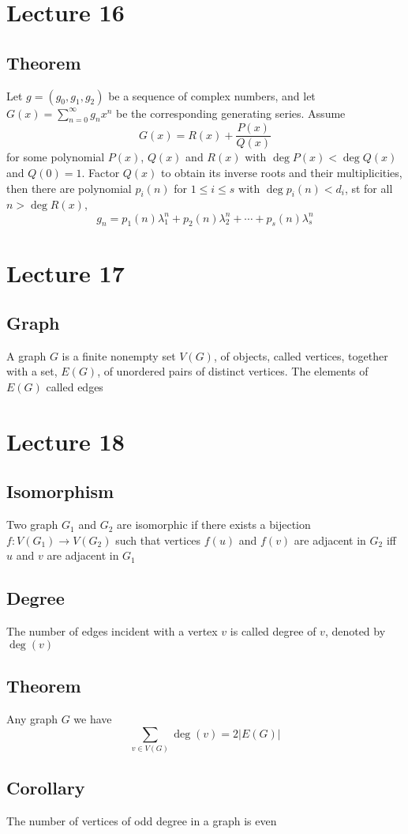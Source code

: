 \documentclass[11pt]{article}
\begin{document}
\section{Lecture 16}
\subsection{Theorem}
Let $g=(g_0,g_1,g_2)$ be a sequence of complex numbers, and let $G(x) = \sum_{n=0}^{\infty}g_nx^n$ be the corresponding generating series. Assume \[G(x) = R(x)+\dfrac{P(x)}{Q(x)}\]
for some polynomial $P(x)$, $Q(x)$ and $R(x)$ with $\deg P(x)<\deg Q(x)$ and $Q(0)=1$.
Factor $Q(x)$ to obtain its inverse roots and their multiplicities, then there are polynomial $p_i(n)$ for $1\leq i\leq s$ with $\deg p_i(n)<d_i$, st for all $n>\deg R(x)$,
\[g_n = p_1(n)\lambda_1^n+p_2(n)\lambda_2^n+\cdots+p_s(n)\lambda_s^n\]

\section{Lecture 17}
\subsection{Graph}
A graph $G$ is a finite nonempty set $V(G)$, of objects, called vertices, together with a set, $E(G)$, of unordered pairs of distinct vertices. The elements of $E(G)$ called edges

\section{Lecture 18}
\subsection{Isomorphism}
Two graph $G_1$ and $G_2$ are isomorphic if there exists a bijection $f:V(G_1)\rightarrow V(G_2)$ such that vertices $f(u)$ and $f(v)$ are adjacent in $G_2$ iff $u$ and $v$ are adjacent in $G_1$
\subsection{Degree}
The number of edges incident with a vertex $v$ is called degree of $v$, denoted by $\deg(v)$
\subsection{Theorem}
Any graph $G$ we have \[\sum_{v\in V(G)}\deg(v) = 2|E(G)|\]
\subsection{Corollary}
The number of vertices of odd degree in a graph is even
\end{document}
